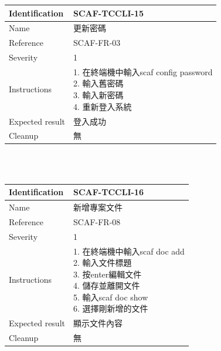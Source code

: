 \documentclass{report}
\begin{document}
\begin{tabularx}{\textwidth}{
  |p{}%
  |p{}|%
  }
  \hline
  \centering Identification &  SCAF-TCCLI-15 \\
  \hline
  \centering Name & 更新密碼 \\
  \hline
  \centering Reference & SCAF-FR-03 \\
  \hline
  \centering Severity & 1 \\
  \hline
  \centering Instructions & 
  \makecell[l]{
    1. 在終端機中輸入scaf config password \\
    2. 輸入舊密碼 \\
    3. 輸入新密碼 \\
    4. 重新登入系統 \\
  }\\
  \hline
  \centering Expected result & 登入成功 \\
  \hline
  \centering Cleanup & 無 \\
  \hline
\end{tabularx}
\\
\newline
\\

\begin{tabularx}{\textwidth}{
  |p{}%
  |p{}|%
  }
  \hline
  \centering Identification &  SCAF-TCCLI-16 \\
  \hline
  \centering Name & 新增專案文件 \\
  \hline
  \centering Reference & SCAF-FR-08 \\
  \hline
  \centering Severity & 1 \\
  \hline
  \centering Instructions & 
  \makecell[l]{
    1. 在終端機中輸入scaf doc add \\
    2. 輸入文件標題 \\
    3. 按enter編輯文件\\
    4. 儲存並離開文件 \\
    5. 輸入scaf doc show \\
    6. 選擇剛新增的文件 \\
  }\\
  \hline
  \centering Expected result & 顯示文件內容 \\
  \hline
  \centering Cleanup & 無 \\
  \hline
\end{tabularx}
\\
\newline
\\
\end{document}
